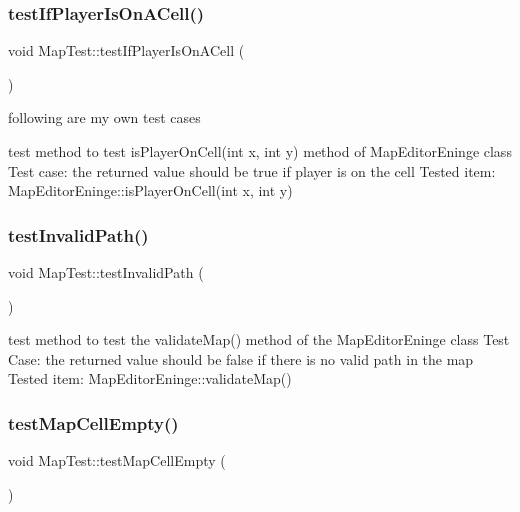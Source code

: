 \subsubsection{\texorpdfstring{test\+If\+Player\+Is\+On\+A\+Cell()}{testIfPlayerIsOnACell()}}
{\footnotesize\ttfamily void Map\+Test\+::test\+If\+Player\+Is\+On\+A\+Cell (\begin{DoxyParamCaption}{ }\end{DoxyParamCaption})\hspace{0.3cm}{\ttfamily [protected]}}



following are my own test cases 

test method to test is\+Player\+On\+Cell(int x, int y) method of Map\+Editor\+Eninge class Test case\+: the returned value should be true if player is on the cell Tested item\+: Map\+Editor\+Eninge\+::is\+Player\+On\+Cell(int x, int y) \hypertarget{class_map_test_ad8823027d386c8d25f378d02adad120d}{}\label{class_map_test_ad8823027d386c8d25f378d02adad120d} 
\subsubsection{\texorpdfstring{test\+Invalid\+Path()}{testInvalidPath()}}
{\footnotesize\ttfamily void Map\+Test\+::test\+Invalid\+Path (\begin{DoxyParamCaption}{ }\end{DoxyParamCaption})\hspace{0.3cm}{\ttfamily [protected]}}

test method to test the validate\+Map() method of the Map\+Editor\+Eninge class Test Case\+: the returned value should be false if there is no valid path in the map Tested item\+: Map\+Editor\+Eninge\+::validate\+Map() \hypertarget{class_map_test_a83bb3473f74089996c7f6bee8d59a97c}{}\label{class_map_test_a83bb3473f74089996c7f6bee8d59a97c} 
\subsubsection{\texorpdfstring{test\+Map\+Cell\+Empty()}{testMapCellEmpty()}}
{\footnotesize\ttfamily void Map\+Test\+::test\+Map\+Cell\+Empty (\begin{DoxyParamCaption}{ }\end{DoxyParamCaption})\hspace{0.3cm}{\ttfamily [protected]}}

